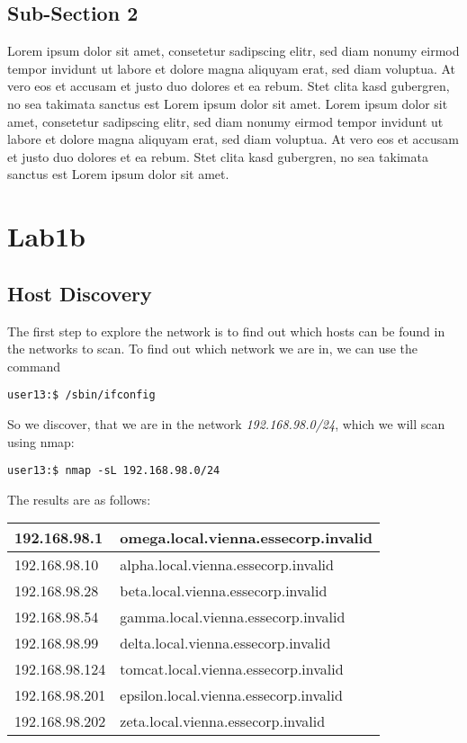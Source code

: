 \documentclass[12pt,a4paper,titlepage,oneside]{scrartcl}
\begin{document}
\subsection{Sub-Section 2}
Lorem ipsum dolor sit amet, consetetur sadipscing elitr, sed diam nonumy eirmod tempor invidunt ut labore et dolore magna aliquyam erat, sed diam voluptua. At vero eos et accusam et justo duo dolores et ea rebum. Stet clita kasd gubergren, no sea takimata sanctus est Lorem ipsum dolor sit amet. Lorem ipsum dolor sit amet, consetetur sadipscing elitr, sed diam nonumy eirmod tempor invidunt ut labore et dolore magna aliquyam erat, sed diam voluptua. At vero eos et accusam et justo duo dolores et ea rebum. Stet clita kasd gubergren, no sea takimata sanctus est Lorem ipsum dolor sit amet.

\section{Lab1b}

\subsection{Host Discovery}
The first step to explore the network is to find out which hosts can be found in the networks to scan. To find out which network we are in, we can use the command

\begin{lstlisting}[style=simple]
user13:$ /sbin/ifconfig 
\end{lstlisting}

So we discover, that we are in the network \emph{192.168.98.0/24}, which we will scan using nmap:

\begin{lstlisting}[style=simple]
user13:$ nmap -sL 192.168.98.0/24
\end{lstlisting}

The results are as follows:

\begin{tabular}{ l | l }
\hline
192.168.98.1 & omega.local.vienna.essecorp.invalid \\ \hline
192.168.98.10 & alpha.local.vienna.essecorp.invalid \\ \hline
192.168.98.28 & beta.local.vienna.essecorp.invalid \\ \hline
192.168.98.54 & gamma.local.vienna.essecorp.invalid \\ \hline
192.168.98.99 & delta.local.vienna.essecorp.invalid \\ \hline
192.168.98.124 & tomcat.local.vienna.essecorp.invalid \\ \hline
192.168.98.201 & epsilon.local.vienna.essecorp.invalid \\ \hline
192.168.98.202 & zeta.local.vienna.essecorp.invalid \\ \hline
\end{tabular}
\end{document}
